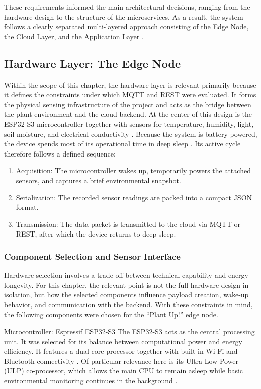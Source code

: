 These requirements informed the main architectural decisions, ranging from the hardware design to the structure of the microservices. As a result, the system follows a clearly separated multi-layered approach consisting of the Edge Node, the Cloud Layer, and the Application Layer \cite{nistNoT2016, cheThreeTier}.

\subsection{Hardware Layer: The Edge Node}
Within the scope of this chapter, the hardware layer is relevant primarily because it defines the constraints under which MQTT and REST were evaluated. It forms the physical sensing infrastructure of the project and acts as the bridge between the plant environment and the cloud backend. At the center of this design is the ESP32-S3 microcontroller together with sensors for temperature, humidity, light, soil moisture, and electrical conductivity \cite{esp32s3Datasheet2026, boniecki2023smartSensors}. Because the system is battery-powered, the device spends most of its operational time in deep sleep \cite{espIdfS3SleepModes}. Its active cycle therefore follows a defined sequence:

\begin{enumerate}
    \item Acquisition: The microcontroller wakes up, temporarily powers the attached sensors, and captures a brief environmental snapshot.
    \item Serialization: The recorded sensor readings are packed into a compact JSON format.
    \item Transmission: The data packet is transmitted to the cloud via MQTT or REST, after which the device returns to deep sleep.
\end{enumerate}

\subsubsection{Component Selection and Sensor Interface}
Hardware selection involves a trade-off between technical capability and energy longevity. For this chapter, the relevant point is not the full hardware design in isolation, but how the selected components influence payload creation, wake-up behavior, and communication with the backend. With these constraints in mind, the following components were chosen for the ``Plant Up!'' edge node.

Microcontroller: Espressif ESP32-S3
The ESP32-S3 acts as the central processing unit. It was selected for its balance between computational power and energy efficiency. It features a dual-core processor together with built-in Wi-Fi and Bluetooth connectivity \cite{esp32s3Datasheet2026}. Of particular relevance here is its Ultra-Low Power (ULP) co-processor, which allows the main CPU to remain asleep while basic environmental monitoring continues in the background \cite{espIdfS3Ulp}.

